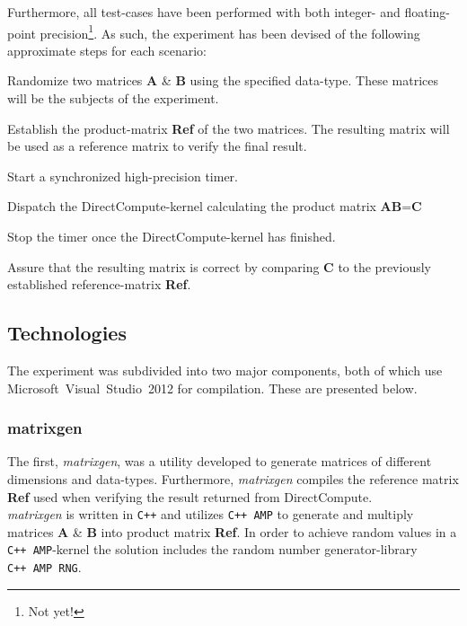 \documentclass[fleqn,10pt]{SelfArx} %
\begin{document}
Furthermore, all test-cases have been performed with both integer- and floating-point precision\footnote{Not yet!}. As such, the experiment has been devised of the following approximate steps for each scenario:
\begin{enumerate*}
	\item Randomize two matrices \textbf{A} \& \textbf{B} using the specified data-type. These matrices will be the subjects of the experiment.
	\item Establish the product-matrix \textbf{Ref} of the two matrices. The resulting matrix will be used as a reference matrix to verify the final result.
	\item Start a synchronized high-precision timer.
	\item Dispatch the DirectCompute-kernel calculating the product matrix \textbf{A}\textbf{B}=\textbf{C}
	\item Stop the timer once the DirectCompute-kernel has finished.
	\item Assure that the resulting matrix is correct by comparing \textbf{C} to the previously established reference-matrix \textbf{Ref}.
\end{enumerate*}

\subsection{Technologies}
\label{sec:contribution:technologies}
The experiment was subdivided into two major components, both of which use Microsoft~Visual~Studio~2012 for compilation. These are presented below.

\subsubsection*{matrixgen}
The first, \textit{matrixgen},  was a utility developed to generate matrices of different dimensions and data-types. Furthermore, \textit{matrixgen} compiles the reference matrix \textbf{Ref} used when verifying the result returned from DirectCompute. \\
\textit{matrixgen} is written in \texttt{C++} and utilizes \texttt{C++~AMP} to generate and multiply matrices \textbf{A} \& \textbf{B} into product matrix \textbf{Ref}. In order to achieve random values in a \texttt{C++~AMP}-kernel the solution includes the random number generator-library \texttt{C++~AMP~RNG}.
\end{document}
